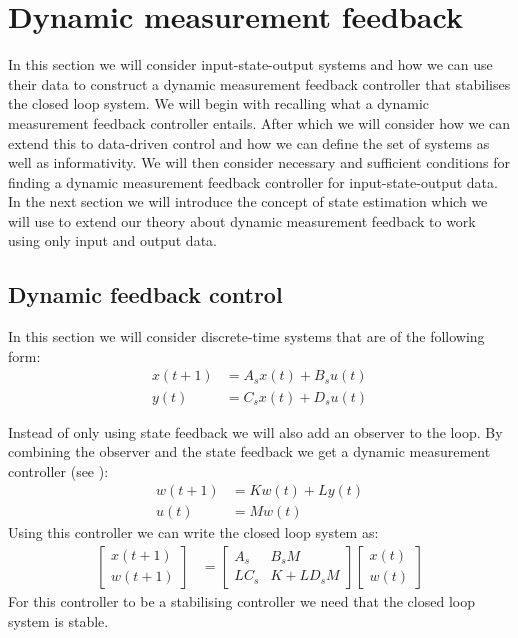 \section{Dynamic measurement feedback}
In this section we will consider input-state-output systems and how we can use their data to construct a dynamic measurement feedback controller that stabilises the closed loop system. We will begin with recalling what a dynamic measurement feedback controller entails. After which we will consider how we can extend this to data-driven control and how we can define the set of systems as well as informativity. We will then consider necessary and sufficient conditions for finding a dynamic measurement feedback controller for input-state-output data. In the next section we will introduce the concept of state estimation which we will use to extend our theory about dynamic measurement feedback to work using only input and output data.

\subsection{Dynamic feedback control}
In this section we will consider discrete-time systems that are of the following form:
\begin{subequations}\label{outputSys}
	\begin{align} 
		x(t+1) &= A_s x(t) + B_s u(t) \\
		y(t)   &= C_s x(t) + D_s u(t)
	\end{align}
\end{subequations}

Instead of only using state feedback we will also add an observer to the loop. By combining the observer and the state feedback we get a dynamic measurement controller (see \cite[section 3.12]{bookTrentelman}):
\begin{align*}
	w(t+1) &= Kw(t) + Ly(t) \\
	u(t)   &= Mw(t)
\end{align*}
Using this controller we can write the closed loop system as:
\begin{align*}
	\begin{bmatrix}
		x(t+1) \\ w(t+1)
	\end{bmatrix}
	&=
	\begin{bmatrix}
		A_s  & B_s M \\ LC_s & K + LD_s M
	\end{bmatrix}
	\begin{bmatrix}
		x(t) \\ w(t)
	\end{bmatrix}
\end{align*}
For this controller to be a stabilising controller we need that the closed loop system is stable.

